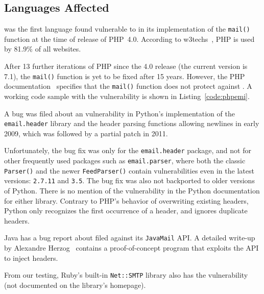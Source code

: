 \subsection{Languages Affected}

\label{languages}
 was the first language found vulnerable to \ehi in its implementation of the \lstinline{mail()} function at the time of release of PHP~4.0. According to w3techs~\cite{W3techs}, PHP is used by 81.9\% of all websites.

After 13 further iterations of PHP since the 4.0 release (the current
version is 7.1), the \texttt{mail()} function is yet to be fixed after
15 years. However, the PHP documentation~\cite{PHPDocs} specifies that the \texttt{mail()} function does not protect against \ehi.
A working code sample with the vulnerability is shown in  Listing~\ref{code:phpemi}.

\begin{sloppypar}
A bug was filed about an \ehi vulnerability in Python's implementation of the \texttt{email.header} library and the header parsing functions allowing newlines in early 2009, which was followed by a partial patch in 2011.
\end{sloppypar}

Unfortunately, the bug fix was only for the \lstinline{email.header} package, and not for other frequently used packages such as\- \lstinline{email.parser}, where both the classic \lstinline{Parser()} and the newer \lstinline{FeedParser()} contain \ehi vulnerabilities even in the latest versions: \lstinline{2.7.11} and \lstinline{3.5}. The bug fix was also not backported to older versions of Python.
There is no mention of the vulnerability in the Python documentation for either library. Contrary to PHP's behavior of overwriting existing headers, Python only recognizes the first occurrence of a header, and ignores duplicate headers.

Java has a bug report about \ehi filed against its \texttt{JavaMail} API. A detailed write-up by Alexandre Herzog~\cite{Herzog.2014} contains a proof-of-concept program that exploits the API to inject headers.

From our testing, Ruby's built-in \texttt{Net::SMTP} library also has the vulnerability (not documented on the library's homepage).


